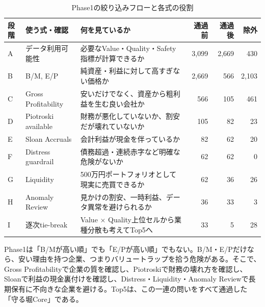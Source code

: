 \documentclass[11pt,a4paper]{article}
\begin{document}
\begin{table}[H]
\caption{Phase1の絞り込みフローと各式の役割}
\label{tab:funnel-result-first}
\centering
\small
\begin{tabularx}{\linewidth}{p{18mm}p{31mm}p{42mm}r r r}
\toprule
段階 & 使う式・確認 & 何を見ているか & 通過前 & 通過後 & 除外 \\
\midrule
A & データ利用可能性 & 必要なValue・Quality・Safety指標が計算できるか & 3,099 & 2,669 & 430 \\
B & B/M, E/P & 純資産・利益に対して高すぎない価格か & 2,669 & 566 & 2,103 \\
C & Gross Profitability & 安いだけでなく、資産から粗利益を生む良い会社か & 566 & 105 & 461 \\
D & Piotroski available & 財務が悪化していないか、割安だが壊れていないか & 105 & 82 & 23 \\
E & Sloan Accruals & 会計利益が現金を伴っているか & 82 & 62 & 20 \\
F & Distress guardrail & 債務超過・連続赤字など明確な危険がないか & 62 & 62 & 0 \\
G & Liquidity & 500万円ポートフォリオとして現実に売買できるか & 62 & 36 & 26 \\
H & Anomaly Review & 見かけの割安、一時利益、データ異常を避けられるか & 36 & 33 & 3 \\
I & 逐次tie-break & Value × Quality上位セルから業種分散も考えてTop5へ & 33 & 5 & 28 \\
\bottomrule
\end{tabularx}
\end{table}

\begin{warnbox}
Phase1は「B/Mが高い順」でも「E/Pが高い順」でもない。B/M・E/Pだけなら、安い理由を持つ企業、つまりバリュートラップを拾う危険がある。そこで、Gross Profitabilityで企業の質を確認し、Piotroskiで財務の壊れ方を確認し、Sloanで利益の現金裏付けを確認し、Distress・Liquidity・Anomaly Reviewで長期保有に不向きな企業を避ける。Top5は、この一連の問いをすべて通過した「守る堀Core」である。
\end{warnbox}
\end{document}
